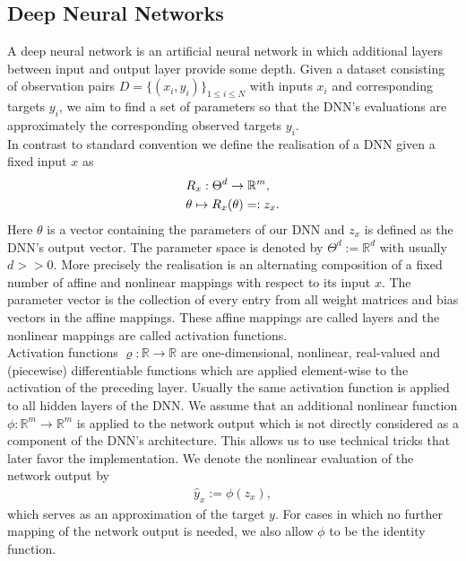 \documentclass[conference]{IEEEtran}
\begin{document}
	\subsection{Deep Neural Networks}
	\noindent
	A deep neural network is an artificial neural network in which additional layers between input and output layer provide some depth. Given a dataset consisting of observation pairs $D =\{(x_{i}, y_{i})\}_{1\leq i\leq N}$ with inputs $x_{i}$ and corresponding targets $y_{i}$, we aim to find a set of parameters so that the DNN's evaluations are approximately the corresponding observed targets $y_{i}$.\\
	In contrast to standard convention we define the realisation of a DNN given a fixed input $x$ as
	\begin{align}
	&R_{x}:\Theta^{d}\rightarrow\mathbb{R}^{m}, \notag\\
	&\theta\mapsto R_{x}(\theta) =: z_{x}.
	\end{align}
	Here $\theta$ is a vector containing the parameters of our DNN and $z_{x}$ is defined as the DNN's output vector. The parameter space is denoted by $\Theta^{d} := \mathbb{R}^{d}$ with usually $d>>0$. More precisely the realisation is an alternating composition of a fixed number of affine and nonlinear mappings with respect to its input $x$. The parameter vector is the collection of every entry from all weight matrices and bias vectors in the affine mappings. These affine mappings are called layers and the nonlinear mappings are called activation functions.\\
	Activation functions $\varrho:\mathbb{R}\rightarrow\mathbb{R}$ are one-dimensional, nonlinear, real-valued and (piecewise) differentiable functions which are applied element-wise to the activation of the preceding layer. Usually the same activation function is applied to all hidden layers of the DNN. We assume that an additional nonlinear function $\phi:\mathbb{R}^{m}\rightarrow\mathbb{R}^{m}$ is applied to the network output which is not directly considered as a component of the DNN's architecture. This allows us to use technical tricks that later favor the implementation. We denote the nonlinear evaluation of the network output by
	\begin{align}
	\hat{y}_{x} := \phi(z_{x}),
	\end{align}
	which serves as an approximation of the target $y$. For cases in which no further mapping of the network output is needed, we also allow $\phi$ to be the identity function.
\end{document}
